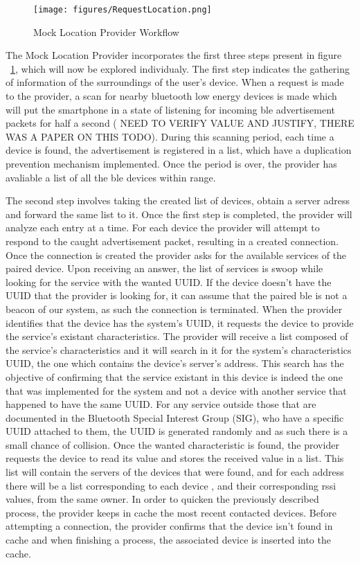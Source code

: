 \documentclass[a4paper]{IEEEtran}
\begin{document}
\begin{figure}
	\centering
		\texttt{[image: figures/RequestLocation.png]}
	\caption[Mock Location Provider Workflow]{Mock Location Provider Workflow}
	\label{fig:MockProvider}
\end{figure}

The Mock Location Provider incorporates the first three steps present in figure ~\ref{fig:MockProvider}, which will now be explored individualy. The first step indicates the gathering of information of the surroundings of the user's device. When a request is made to the provider, a scan for nearby bluetooth low energy devices is made which will put the smartphone in a state of listening for incoming ble advertisement packets for half a second ( NEED TO VERIFY VALUE AND JUSTIFY, THERE WAS A PAPER ON THIS TODO). During this scanning period, each time a device is found, the advertisement is registered in a list, which have a duplication prevention mechanism implemented. Once the period is over, the provider has avaliable a list of all the ble devices within range.   

The second step involves taking the created list of devices, obtain a server adress and forward the same list to it. Once the first step is completed, the provider will analyze each entry at a time. For each device the provider will attempt to respond to the caught advertisement packet, resulting in a created connection.  Once the connection is created the provider asks for the available services of the paired device. Upon receiving an answer, the list of services is swoop while looking for the service with the wanted UUID. If the device doesn't have the UUID that the provider is looking for, it can assume that the paired ble is not a beacon of our system, as such the connection is terminated. When the provider identifies that the device has the system's UUID, it requests the device to provide the service's existant characteristics. The provider will receive a list composed of the service's characteristics and it will search in it for the system's characteristics UUID, the one which contains the device's server's address. This search has the objective of confirming that the service existant in this device is indeed the one that was implemented for the system and not a device with another service that happened to have the same UUID. For any service outside those that are documented in the Bluetooth Special Interest Group (SIG), who have a specific UUID attached to them, the UUID is generated randomly and as such there is a small chance of collision. Once the wanted characteristic is found, the provider requests the device to read its value and stores the received value in a list. This list will contain the servers of the devices that were found, and for each address there will be a list corresponding to each device , and their corresponding rssi values, from the same owner. In order to quicken the previously described process, the provider keeps in cache the most recent contacted devices. Before attempting a connection, the provider confirms that the device isn't found in cache and when finishing a process, the associated device is inserted into the cache.
\end{document}
